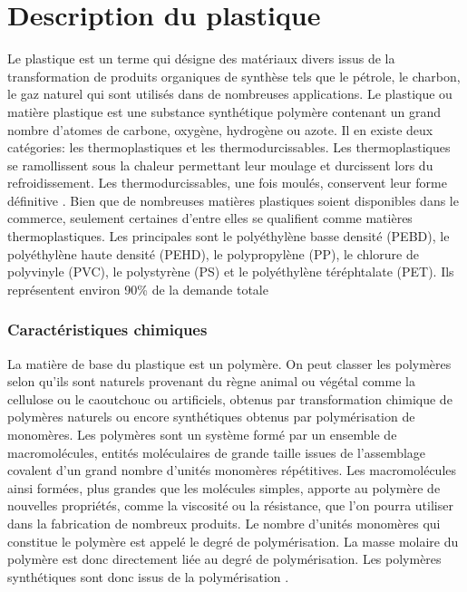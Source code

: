 \part{Description du plastique}
\setcounter{section}{0}
\par{
Le plastique est un terme qui d\'esigne des mat\'eriaux divers issus de la transformation de produits organiques de synth\`ese tels que le p\'etrole, le charbon, le gaz naturel qui sont utilis\'es dans de nombreuses applications. Le plastique ou mati\`ere plastique est une substance synth\'etique polym\`ere contenant un grand nombre d'atomes de carbone, oxyg\`ene, hydrog\`ene ou azote. Il en existe deux cat\'egories: les thermoplastiques et les thermodurcissables. Les thermoplastiques se ramollissent sous la chaleur permettant leur moulage et durcissent lors du refroidissement. Les thermodurcissables, une fois moul\'es, conservent leur forme d\'efinitive {\citep{Valorplast}}. Bien que de nombreuses mati\`eres plastiques soient disponibles dans le commerce, seulement certaines d'entre elles se qualifient comme mati\`eres thermoplastiques. Les principales sont le poly\'ethyl\`ene basse densit\'e (PEBD), le poly\'ethyl\`ene haute densit\'e (PEHD), le polypropyl\`ene (PP), le chlorure de polyvinyle (PVC), le polystyr\`ene (PS) et le poly\'ethyl\`ene t\'er\'ephtalate (PET). Ils repr\'esentent environ 90\% de la demande totale {\citep{andrady2009applications}}
}

\section{Caract\'eristiques chimiques}
\par{
La mati\`ere de base du plastique est un polym\`ere. On peut classer les polym\`eres selon qu'ils sont naturels provenant du r\`egne animal ou v\'eg\'etal comme la cellulose ou le caoutchouc ou artificiels, obtenus par transformation chimique de polym\`eres naturels ou encore synth\'etiques obtenus par polym\'erisation de monom\`eres. Les polym\`eres sont un  syst\`eme form\'e par un ensemble de macromol\'ecules, entit\'es mol\'eculaires de grande taille issues de l'assemblage covalent d'un grand nombre d'unit\'es monom\`eres r\'ep\'etitives. Les macromol\'ecules ainsi form\'ees, plus grandes que les mol\'ecules simples, apporte au polym\`ere de nouvelles propri\'et\'es, comme la viscosit\'e ou la r\'esistance, que l'on pourra utiliser dans la fabrication de nombreux produits. Le nombre d'unit\'es monom\`eres qui constitue le polym\`ere est appel\'e le degr\'e de polym\'erisation. La masse molaire du polym\`ere est donc directement li\'ee au degr\'e de polym\'erisation. Les polym\`eres synth\'etiques sont donc issus de la polym\'erisation {\citep{fontanille2014chimie}}.
}

